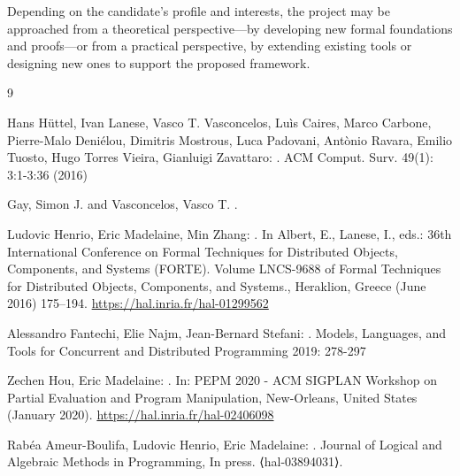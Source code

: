 \documentclass[11pt,a4paper]{article}
\begin{document}
Depending on the candidate’s profile and interests, the project may be approached from a theoretical perspective—by developing new formal foundations and proofs—or from a practical perspective, by extending existing tools or designing new ones to support the proposed framework.


\begin{thebibliography}{9}

Hans H\"uttel, Ivan Lanese, Vasco T. Vasconcelos, Lu\`is Caires, Marco Carbone, Pierre-Malo Deni\'elou, Dimitris Mostrous, Luca Padovani, Ant\`onio Ravara, Emilio Tuosto, Hugo Torres Vieira, Gianluigi Zavattaro:
.
\newblock ACM Comput. Surv. 49(1): 3:1-3:36 (2016)



Gay, Simon J. and Vasconcelos, Vasco T.
.


Ludovic Henrio, Eric Madelaine, Min Zhang:
.
\newblock In Albert, E., Lanese, I., eds.: {36th International Conference on
  Formal Techniques for Distributed Objects, Components, and Systems (FORTE)}.
  Volume LNCS-9688 of Formal Techniques for Distributed Objects, Components,
  and Systems., Heraklion, Greece (June 2016)  175--194. 
\newblock  \url{https://hal.inria.fr/hal-01299562}

Alessandro Fantechi, Elie Najm, Jean-Bernard Stefani:
.
\newblock Models, Languages, and Tools for Concurrent and Distributed Programming 2019: 278-297



Zechen Hou, Eric Madelaine:
.
\newblock In: {PEPM 2020 - ACM SIGPLAN Workshop on Partial Evaluation and
  Program Manipulation}, New-Orleans, United States (January 2020). 
 \newblock \url{https://hal.inria.fr/hal-02406098}

Rabéa Ameur-Boulifa, Ludovic Henrio, Eric Madelaine:
.
\newblock Journal of Logical and Algebraic Methods in Programming, In press. ⟨hal-03894031⟩.
\end{thebibliography}
\end{document}
